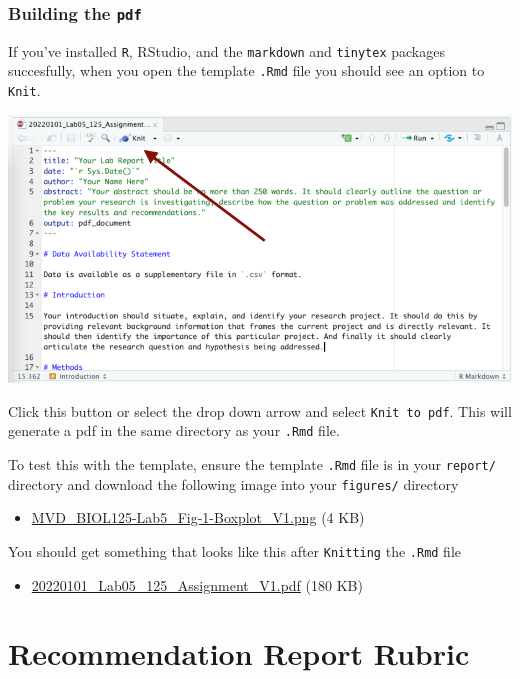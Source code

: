 \documentclass[
]{book}
\providecommand{\tightlist}{%
  \setlength{\itemsep}{0pt}\setlength{\parskip}{0pt}}
\begin{document}
\hypertarget{building-the-pdf}{%
\subsection*{\texorpdfstring{Building the \texttt{pdf}}{Building the pdf}}\label{building-the-pdf}}

If you've installed \texttt{R}, RStudio, and the \texttt{markdown} and \texttt{tinytex} packages succesfully, when you open the template \texttt{.Rmd} file you should see an option to \texttt{Knit}.

\includegraphics{images/Knit_20220101.png}

Click this button or select the drop down arrow and select \texttt{Knit\ to\ pdf}. This will generate a pdf in the same directory as your \texttt{.Rmd} file.

To test this with the template, ensure the template \texttt{.Rmd} file is in your \texttt{report/} directory and download the following image into your \texttt{figures/} directory

\begin{itemize}
\tightlist
\item
  \href{https://osf.io/download/nrzdu}{MVD\_BIOL125-Lab5\_Fig-1-Boxplot\_V1.png} (4 KB)
\end{itemize}

You should get something that looks like this after \texttt{Knitting} the \texttt{.Rmd} file

\begin{itemize}
\tightlist
\item
  \href{https://osf.io/download/6kn7m}{20220101\_Lab05\_125\_Assignment\_V1.pdf} (180 KB)
\end{itemize}

\hypertarget{recommendation-report-rubric-1}{%
\chapter*{Recommendation Report Rubric}\label{recommendation-report-rubric-1}}
\end{document}
